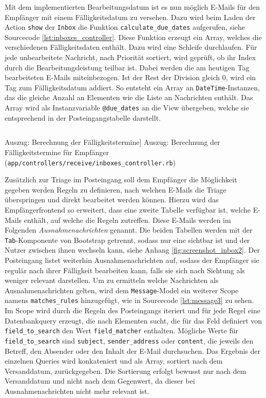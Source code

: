 Mit dem implementierten Bearbeitungsdatum ist es nun möglich E-Mails für den Empfänger mit einem Fälligkeitsdatum zu versehen. Dazu wird beim Laden der Action \texttt{show} der \texttt{Inbox} die Funktion \texttt{calculate\_due\_dates} aufgerufen, siehe Sourcecode \ref{lst:inboxes_controller}. Diese Funktion erzeugt ein Array, welches die verschiedenen Fälligkeitsdaten enthält. Dazu wird eine Schleife durchlaufen. Für jede unbearbeitete Nachricht, nach Priorität sortiert, wird geprüft, ob ihr Index durch die Bearbeitungsleistung teilbar ist. Dabei werden die am heutigen Tag bearbeiteten E-Mails miteinbezogen. Ist der Rest der Division gleich 0, wird ein Tag zum Fälligkeitsdatum addiert. So entsteht ein Array an \texttt{DateTime}-Instanzen, das die gleiche Anzahl an Elementen wie die Liste an Nachrichten enthält. Das Array wird als Instanzvariable \texttt{@due\_dates} an die View übergeben, welche sie entsprechend in der Posteingangstabelle darstellt. 

\begin{listing}[!ht]
\inputminted[firstline=12, lastline=23, linenos]{ruby}{Listings/Pkg3/inboxes_controller.rb}

\caption
    [Auszug: Berechnung der Fälligkeitstermine]
    {Auszug: Berechnung der Fälligkeitstermine für Empfänger (\texttt{app/controllers/receive/inboxes\_controller.rb})}

\label{lst:inboxes_controller}
\end{listing}

\newpage

\noindent Zusätzlich zur Triage im Posteingang soll dem Empfänger die Möglichkeit gegeben werden Regeln zu definieren, nach welchen E-Mails die Triage überspringen und direkt bearbeitet werden können. Hierzu wird das Empfängerfrontend so erweitert, dass eine zweite Tabelle verfügbar ist, welche E-Mails enthält, auf welche die Regeln zutreffen. Diese E-Mails werden im Folgenden \textit{Ausnahmenachrichten} genannt. Die beiden Tabellen werden mit der \texttt{Tab}-Komponente von Bootstrap getrennt, sodass nur eine sichtbar ist und der Nutzer zwischen ihnen wechseln kann, siehe Anhang \ref{fig:screenshot_inbox2}. Der Posteingang listet weiterhin Ausnahmenachrichten auf, sodass der Empfänger sie regulär nach ihrer Fälligkeit bearbeiten kann, falls sie sich nach Sichtung als weniger relevant darstellen. Um zu ermitteln welche Nachrichten als Ausnahmenachrichten gelten, wird dem \texttt{Message}-Model ein weiterer Scope namens \texttt{matches\_rules} hinzugefügt, wie in Sourcecode \ref{lst:message3} zu sehen. Im Scope wird durch die Regeln des Posteingangs iteriert und für jede Regel eine Datenbankquery erzeugt, die nach Elementen sucht, die für das Feld definiert von \texttt{field\_to\_search} den Wert \texttt{field\_matcher} enthalten. Mögliche Werte für \texttt{field\_to\_search} sind \texttt{subject}, \texttt{sender\_address} oder \texttt{content}, die jeweils den Betreff, den Absender oder den Inhalt der E-Mail durchsuchen. Das Ergebnis der einzelnen Queries wird konkateniert und als Array, sortiert nach dem Versanddatum, zurückgegeben. Die Sortierung erfolgt bewusst nur nach dem Versanddatum und nicht nach dem Gegenwert, da dieser bei Ausnahmenachrichten nicht mehr relevant ist.

